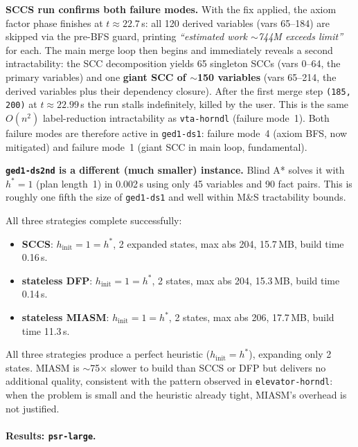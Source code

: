 \documentclass[11pt,a4paper]{article}
\begin{document}
    \textbf{SCCS run confirms both failure modes.}  With the fix applied,
    the axiom factor phase finishes at $t \approx 22.7$\,s: all 120 derived
    variables (vars 65--184) are skipped via the pre-BFS guard, printing
    \emph{``estimated work $\sim$744M exceeds limit''} for each.  The main
    merge loop then begins and immediately reveals a second intractability:
    the SCC decomposition yields 65 singleton SCCs (vars 0--64, the primary
    variables) and one \textbf{giant SCC of $\sim$150 variables} (vars
    65--214, the derived variables plus their dependency closure).  After
    the first merge step \texttt{(185, 200)} at $t \approx 22.99$\,s the
    run stalls indefinitely, killed by the user.  This is the same
    $O(n^2)$ label-reduction intractability as \texttt{vta-horndl}
    (failure mode~1).  Both failure modes are therefore active in
    \texttt{ged1-ds1}: failure mode~4 (axiom BFS, now mitigated) and
    failure mode~1 (giant SCC in main loop, fundamental).

    \textbf{\texttt{ged1-ds2nd} is a different (much smaller) instance.}
    Blind A* solves it with $h^* = 1$ (plan length~1) in 0.002\,s using
    only 45 variables and 90 fact pairs.  This is roughly one fifth the
    size of \texttt{ged1-ds1} and well within M\&S tractability bounds.

    All three strategies complete successfully:
    \begin{itemize}
      \item \textbf{SCCS}: $h_{\mathrm{init}} = 1 = h^*$, 2 expanded states,
            max abs 204, 15.7\,MB, build time 0.16\,s.
      \item \textbf{stateless DFP}: $h_{\mathrm{init}} = 1 = h^*$, 2 states,
            max abs 204, 15.3\,MB, build time 0.14\,s.
      \item \textbf{stateless MIASM}: $h_{\mathrm{init}} = 1 = h^*$, 2 states,
            max abs 206, 17.7\,MB, build time 11.3\,s.
    \end{itemize}
    All three strategies produce a perfect heuristic ($h_{\mathrm{init}} = h^*$),
    expanding only 2 states.  MIASM is $\sim$75$\times$ slower to build
    than SCCS or DFP but delivers no additional quality, consistent with
    the pattern observed in \texttt{elevator-horndl}: when the problem is
    small and the heuristic already tight, MIASM's overhead is not
    justified.

    \paragraph{Results: \texttt{psr-large}.}
\end{document}
